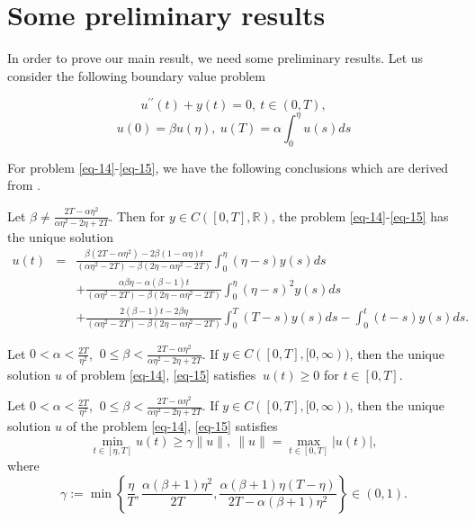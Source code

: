 \documentclass[reqno]{amsart}\usepackage{amsmath}
\begin{document}
\section{Some preliminary results}
In order to prove our main result, we need some preliminary results. Let
us consider the following boundary value problem

\begin{equation}\label{eq-14}
{u^{\prime \prime }}(t)+y(t)=0, \ t\in (0,T),
\end{equation}
\begin{equation}\label{eq-15}
u(0)=\beta u(\eta ), \ u(T)=\alpha \int_{0}^{\eta }u(s)ds
\end{equation}

For problem \eqref{eq-14}-\eqref{eq-15}, we have the following conclusions which are derived
from \cite{Had1}.


\begin{lemma}\label{lem 3.1}
Let $\beta \neq \frac{2T-\alpha \eta ^{2}}{\alpha \eta ^{2}-2\eta
+2T}$. Then for $y\in C([0,T],\mathbb{R})$, the problem \eqref{eq-14}-\eqref{eq-15} has
the unique solution
\begin{eqnarray*}
u(t)&=&\frac{\beta (2T-\alpha \eta ^{2})-2\beta (1-\alpha \eta
)t}{(\alpha \eta ^{2}-2T)-\beta (2\eta -\alpha \eta
^{2}-2T)}\int_{0}^{\eta }(\eta -s)y(s)ds \\
&&+\frac{\alpha \beta
\eta -\alpha (\beta -1)t}{(\alpha \eta ^{2}-2T)-\beta (2\eta -\alpha
\eta
^{2}-2T)}\int_{0}^{\eta }(\eta -s)^{2}y(s)ds \\
&&+\frac{2(\beta-1)t-2\beta \eta }{(\alpha \eta
^{2}-2T)-\beta (2\eta -\alpha \eta ^{2}-2T)}\int_{0}^{T}(T-s)y(s)ds-\int_{0}^{t}(t-s)y(s)ds.
\end{eqnarray*}
\end{lemma}


\begin{lemma}\label{lem 3.2}
Let $0<\alpha <\frac{2T}{\eta ^{2}}$, $\ 0\leq \beta <\frac{2T-\alpha \eta ^{2}}{\alpha \eta ^{2}-2\eta +2T}$. If $y\in C([0,T],[0,\infty
))$, then the unique solution $u$ of problem
\eqref{eq-14}, \eqref{eq-15} satisfies $\ u(t)\geq 0$ for $t\in [0,T]$.
\end{lemma}

\begin{lemma}\label{lem 3.3}
Let $0<\alpha <\frac{2T}{\eta ^{2}}$, $\ 0\leq\beta <\frac{2T-\alpha \eta ^{2}}{\alpha \eta ^{2}-2\eta +2T}$. If $y\in
C([0,T],[0,\infty ))$, then the unique solution $u$ of the problem
\eqref{eq-14}, \eqref{eq-15} satisfies
\begin{equation} \label{eq-16}
\min_{t\in [\eta,T]}u(t)\geq \gamma \|u\|,\ \|u\|=\max_{t\in
[0,T]}|u(t)|,
\end{equation}
where
\begin{equation} \label{eq-17}
\gamma:=\min\left\{\frac{\eta}{T},
\frac{\alpha(\beta+1)\eta^{2}}{2T},
\frac{\alpha(\beta+1)\eta(T-\eta)}{2T-\alpha(\beta+1)\eta^{2}}\right\}\in\left(0,1\right).
\end{equation}
\end{lemma}
\end{document}

